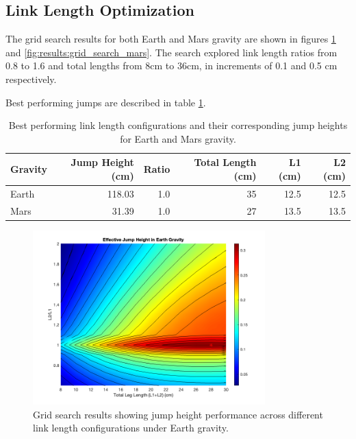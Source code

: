 \subsection{Link Length Optimization}
The grid search results for both Earth and Mars gravity are shown in figures \ref{fig:results:grid_search_earth} and \ref{fig:results:grid_search_mars}. The search explored link length ratios from 0.8 to 1.6 and total lengths from 8cm to 36cm, in increments of 0.1 and 0.5 cm respectively.

Best performing jumps are described in table \ref{tab:results:grid_search_earth:best_jumps}.
\begin{table}[h]
    \centering
    \begin{tabular}{lrrrrr}
        \hline
        Gravity & Jump Height (cm) & Ratio & Total Length (cm) & L1 (cm) & L2 (cm) \\
        \hline
        Earth & 118.03 & 1.0 & 35 & 12.5 & 12.5 \\
        Mars & 31.39 & 1.0 & 27 & 13.5 & 13.5 \\
        \hline
    \end{tabular}
    \caption{Best performing link length configurations and their corresponding jump heights for Earth and Mars gravity.}
    \label{tab:results:grid_search_earth:best_jumps}
\end{table}


\begin{figure}[h]
    \centering
    \includegraphics[width=0.8\textwidth]{Images/results/grid_search_results_earth_flat.png}
    \caption{Grid search results showing jump height performance across different link length configurations under Earth gravity.}
    \label{fig:results:grid_search_earth}
\end{figure}



